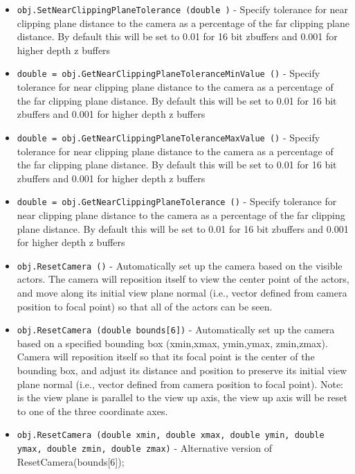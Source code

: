 \begin{itemize}
\item  \verb|obj.SetNearClippingPlaneTolerance (double )| -  Specify tolerance for near clipping plane distance to the camera as a
 percentage of the far clipping plane distance. By default this will be
 set to 0.01 for 16 bit zbuffers and 0.001 for higher depth z buffers

\item  \verb|double = obj.GetNearClippingPlaneToleranceMinValue ()| -  Specify tolerance for near clipping plane distance to the camera as a
 percentage of the far clipping plane distance. By default this will be
 set to 0.01 for 16 bit zbuffers and 0.001 for higher depth z buffers

\item  \verb|double = obj.GetNearClippingPlaneToleranceMaxValue ()| -  Specify tolerance for near clipping plane distance to the camera as a
 percentage of the far clipping plane distance. By default this will be
 set to 0.01 for 16 bit zbuffers and 0.001 for higher depth z buffers

\item  \verb|double = obj.GetNearClippingPlaneTolerance ()| -  Specify tolerance for near clipping plane distance to the camera as a
 percentage of the far clipping plane distance. By default this will be
 set to 0.01 for 16 bit zbuffers and 0.001 for higher depth z buffers

\item  \verb|obj.ResetCamera ()| -  Automatically set up the camera based on the visible actors.
 The camera will reposition itself to view the center point of the actors,
 and move along its initial view plane normal (i.e., vector defined from
 camera position to focal point) so that all of the actors can be seen.

\item  \verb|obj.ResetCamera (double bounds[6])| -  Automatically set up the camera based on a specified bounding box
 (xmin,xmax, ymin,ymax, zmin,zmax). Camera will reposition itself so
 that its focal point is the center of the bounding box, and adjust its
 distance and position to preserve its initial view plane normal
 (i.e., vector defined from camera position to focal point). Note: is
 the view plane is parallel to the view up axis, the view up axis will
 be reset to one of the three coordinate axes.

\item  \verb|obj.ResetCamera (double xmin, double xmax, double ymin, double ymax, double zmin, double zmax)| -  Alternative version of ResetCamera(bounds[6]);


\end{itemize}
